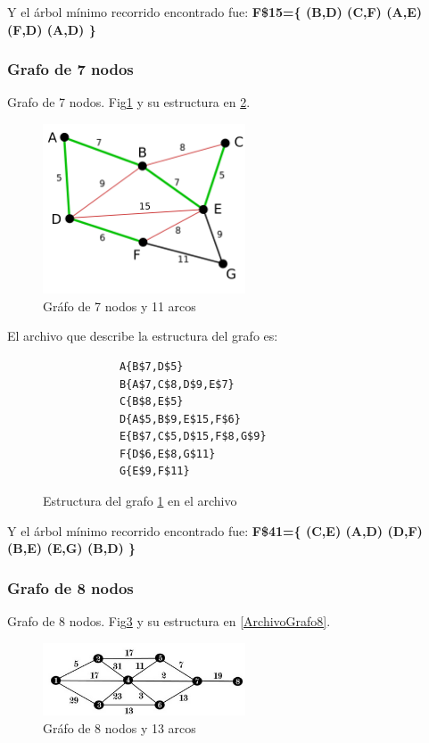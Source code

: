         Y el árbol mínimo recorrido encontrado fue: \textbf{F\$15=\{ (B,D)  (C,F)  (A,E)  (F,D)  (A,D) \}}
        
        \subsubsection*{Grafo de 7 nodos}
        Grafo de 7 nodos. Fig\ref{Grafo7} y su estructura en \ref{ArchivoGrafo7}.
        
        \begin{figure}[h!]
            \centering
            \includegraphics[width=6cm]{Kruskal/Grafo7.png}
            \caption{Gráfo de 7 nodos y 11 arcos}
            \label{Grafo7}
        \end{figure}
            
        El archivo que describe la estructura del grafo es:
        \begin{figure}[h!]
            \centering
            \begin{verbatim}
            A{B$7,D$5}
            B{A$7,C$8,D$9,E$7}
            C{B$8,E$5}
            D{A$5,B$9,E$15,F$6}
            E{B$7,C$5,D$15,F$8,G$9}
            F{D$6,E$8,G$11}
            G{E$9,F$11}\end{verbatim}
            \caption{Estructura del grafo \ref{Grafo7} en el archivo}
            \label{ArchivoGrafo7}
        \end{figure} 
        
        Y el árbol mínimo recorrido encontrado fue: \textbf{F\$41=\{ (C,E)  (A,D)  (D,F)  (B,E)  (E,G)  (B,D) \}}
    
        \newpage
    
        \subsubsection*{Grafo de 8 nodos}
        Grafo de 8 nodos. Fig\ref{Grafo8} y su estructura en \ref{ArchivoGrafo8}.
        
        \begin{figure}[h!]
            \centering
            \includegraphics[width=6cm]{Kruskal/Grafo8.png}
            \caption{Gráfo de 8 nodos y 13 arcos}
            \label{Grafo8}
        \end{figure}
            
